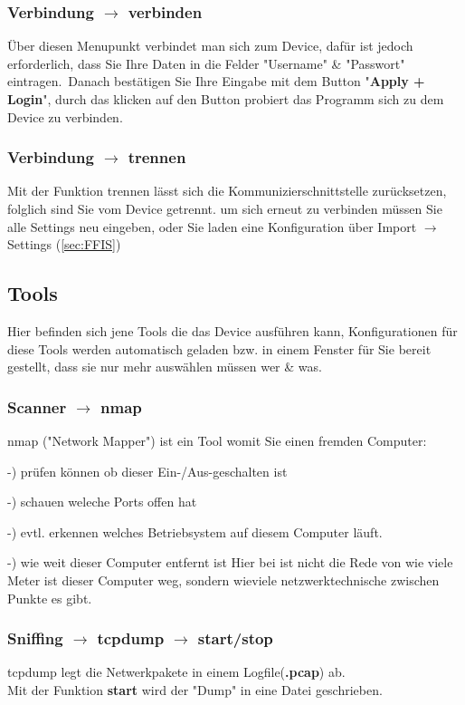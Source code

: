 \documentclass[11pt]{article} %
\begin{document}
\subsubsection{Verbindung $\rightarrow$ verbinden}
Über diesen Menupunkt verbindet man sich zum Device, dafür ist jedoch erforderlich, dass Sie Ihre Daten in die Felder "Username" \& "Passwort" eintragen.\
Danach bestätigen Sie Ihre Eingabe mit dem Button "\textbf{Apply + Login}", durch das klicken auf den Button probiert das Programm sich zu dem Device zu verbinden.\\
\color{green}{\textbf{Bild}}\color{black}
\subsubsection{Verbindung $\rightarrow$ trennen}
Mit der Funktion trennen lässt sich die Kommunizierschnittstelle zurücksetzen, folglich sind Sie vom Device getrennt. um sich erneut zu verbinden müssen Sie alle Settings neu eingeben, oder Sie laden eine Konfiguration über Import $\rightarrow$ Settings (\ref{sec:FFIS}) \\
\pagebreak
\subsection{Tools}
Hier befinden sich jene Tools die das Device ausführen kann, Konfigurationen für diese Tools werden automatisch geladen bzw. in einem Fenster für Sie bereit gestellt, dass sie nur mehr auswählen müssen wer \& was.\\
\subsubsection{Scanner $\rightarrow$ nmap}
nmap ("Network Mapper") ist ein Tool womit Sie einen fremden Computer:

-) prüfen können ob dieser Ein-/Aus-geschalten ist

-) schauen weleche Ports offen hat

-) evtl. erkennen welches Betriebsystem auf diesem Computer läuft.

-) wie weit dieser Computer entfernt ist
Hier bei ist nicht die Rede von wie viele Meter ist dieser Computer weg, sondern wieviele netzwerktechnische zwischen Punkte es gibt.\\
 \color{green}{\textbf{Bild}}\color{black}
\subsubsection{Sniffing $\rightarrow$ tcpdump $\rightarrow$ start/stop}
tcpdump legt die Netwerkpakete in einem Logfile(\textbf{.pcap}) ab. \\
Mit der Funktion \textbf{start} wird der "Dump" in eine Datei geschrieben.
\end{document}
